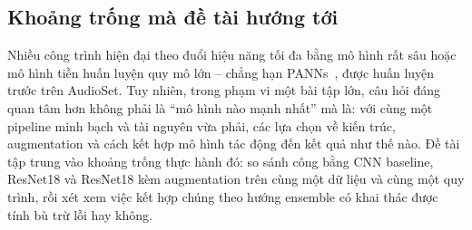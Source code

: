 \subsection{Khoảng trống mà đề tài hướng tới}

Nhiều công trình hiện đại theo đuổi hiệu năng tối đa bằng mô hình rất sâu hoặc mô
hình tiền huấn luyện quy mô lớn -- chẳng hạn PANNs~\cite{kong2020}, được huấn
luyện trước trên AudioSet. Tuy nhiên, trong phạm vi một bài tập lớn, câu hỏi đáng
quan tâm hơn không phải là ``mô hình nào mạnh nhất'' mà là: với cùng một pipeline
minh bạch và tài nguyên vừa phải, các lựa chọn về kiến trúc, augmentation và cách
kết hợp mô hình tác động đến kết quả như thế nào. Đề tài tập trung vào khoảng
trống thực hành đó: so sánh công bằng CNN baseline, ResNet18 và ResNet18 kèm
augmentation trên cùng một dữ liệu và cùng một quy trình, rồi xét xem việc kết
hợp chúng theo hướng ensemble có khai thác được tính bù trừ lỗi hay không.
